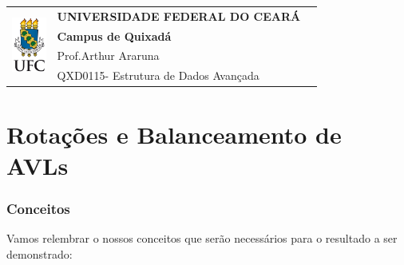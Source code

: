 \documentclass[11pt,twoside]{article}
\theoremstyle{definition}
\def\disciplinacodigotext{QXD0115}
\def\disciplinanometext{Estrutura de Dados Avançada}
\def\provatitle{Rotações e Balanceamento de AVLs}
\def\professorabbrv{Prof.}
\def\professornometext{Arthur Araruna}
\begin{document}
\noindent
\begin{minipage}{\textwidth}
	\begin{tabularx}{\textwidth}{cXc}
		\multirow{4}{*}{\includegraphics[height=1.8cm]{../brasaoufc.pdf}} & {\bf UNIVERSIDADE FEDERAL DO CEARÁ}         & \multirow{3}{*}{} \\
		                                                                  & {\bf Campus de Quixadá}                     &                   \\
		                                                                  & \professorabbrv\enspace\professornometext   &                   \\
		                                                                  & \disciplinacodigotext - \disciplinanometext & {}                \\
	\end{tabularx}
\end{minipage}

\part*{\provatitle}

\section{Conceitos}

Vamos relembrar o nossos conceitos que serão necessários para o resultado a ser demonstrado:
\end{document}
